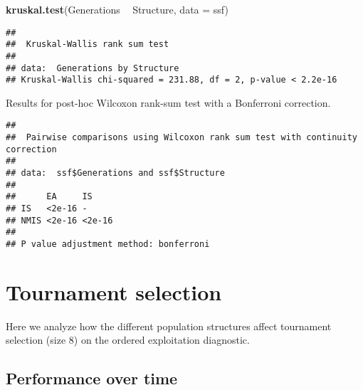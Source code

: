 \documentclass[]{book}
\newenvironment{Shaded}{\begin{snugshade}}{\end{snugshade}}
\newcommand{\DataTypeTok}[1]{\textcolor[rgb]{0.13,0.29,0.53}{#1}}
\newcommand{\KeywordTok}[1]{\textcolor[rgb]{0.13,0.29,0.53}{\textbf{#1}}}
\newcommand{\NormalTok}[1]{#1}
\newcommand{\OperatorTok}[1]{\textcolor[rgb]{0.81,0.36,0.00}{\textbf{#1}}}
\newcommand{\OtherTok}[1]{\textcolor[rgb]{0.56,0.35,0.01}{#1}}
\newcommand{\StringTok}[1]{\textcolor[rgb]{0.31,0.60,0.02}{#1}}
\begin{document}
\begin{Shaded}
\begin{Highlighting}[]
\KeywordTok{kruskal.test}\NormalTok{(Generations }\OperatorTok{~}\StringTok{ }\NormalTok{Structure, }\DataTypeTok{data =}\NormalTok{ ssf)}
\end{Highlighting}
\end{Shaded}

\begin{verbatim}
## 
##  Kruskal-Wallis rank sum test
## 
## data:  Generations by Structure
## Kruskal-Wallis chi-squared = 231.88, df = 2, p-value < 2.2e-16
\end{verbatim}

Results for post-hoc Wilcoxon rank-sum test with a Bonferroni correction.

\begin{Shaded}
\end{Shaded}

\begin{verbatim}
## 
##  Pairwise comparisons using Wilcoxon rank sum test with continuity correction 
## 
## data:  ssf$Generations and ssf$Structure 
## 
##      EA     IS    
## IS   <2e-16 -     
## NMIS <2e-16 <2e-16
## 
## P value adjustment method: bonferroni
\end{verbatim}

\hypertarget{tournament-selection-1}{%
\section{Tournament selection}\label{tournament-selection-1}}

Here we analyze how the different population structures affect tournament selection (size 8) on the ordered exploitation diagnostic.

\hypertarget{performance-over-time-4}{%
\subsection{Performance over time}\label{performance-over-time-4}}
\end{document}
